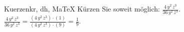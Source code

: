 \begin{MAufgabe}{Kuerzen}{kr, dh, MaTeX}
K\"urzen Sie soweit m\"oglich: $\frac{4\, y^2\, z^3}{36\, y^2\, z^3}$.\\ 
\ifLsg\MLoesung
\quad $\frac{4\, y^2\, z^3}{36\, y^2\, z^3}=\frac{(4\, y^2\, z^3)\cdot(1)}{(4\, y^2\, z^3)\cdot(9)}=\frac{1}{9}$.\else\relax\fi
 \end{MAufgabe}